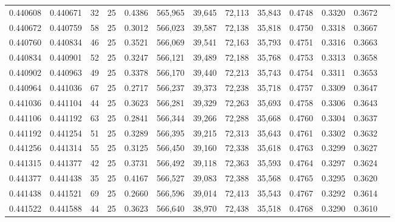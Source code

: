 \begin{tabular}{rrrrrrrrrrrrr}
0.440608 & 0.440671 &    32 &  25 &                                     0.4386 & 565,965 &  39,645 &  72,113 &  35,843 & 0.4748 & 0.3320 & 0.3672 \\
0.440672 & 0.440759 &    58 &  25 &                                     0.3012 & 566,023 &  39,587 &  72,138 &  35,818 & 0.4750 & 0.3318 & 0.3667 \\
0.440760 & 0.440834 &    46 &  25 &                                     0.3521 & 566,069 &  39,541 &  72,163 &  35,793 & 0.4751 & 0.3316 & 0.3663 \\
0.440834 & 0.440901 &    52 &  25 &                                     0.3247 & 566,121 &  39,489 &  72,188 &  35,768 & 0.4753 & 0.3313 & 0.3658 \\
0.440902 & 0.440963 &    49 &  25 &                                     0.3378 & 566,170 &  39,440 &  72,213 &  35,743 & 0.4754 & 0.3311 & 0.3653 \\
0.440964 & 0.441036 &    67 &  25 &                                     0.2717 & 566,237 &  39,373 &  72,238 &  35,718 & 0.4757 & 0.3309 & 0.3647 \\
0.441036 & 0.441104 &    44 &  25 &                                     0.3623 & 566,281 &  39,329 &  72,263 &  35,693 & 0.4758 & 0.3306 & 0.3643 \\
0.441106 & 0.441192 &    63 &  25 &                                     0.2841 & 566,344 &  39,266 &  72,288 &  35,668 & 0.4760 & 0.3304 & 0.3637 \\
0.441192 & 0.441254 &    51 &  25 &                                     0.3289 & 566,395 &  39,215 &  72,313 &  35,643 & 0.4761 & 0.3302 & 0.3632 \\
0.441256 & 0.441314 &    55 &  25 &                                     0.3125 & 566,450 &  39,160 &  72,338 &  35,618 & 0.4763 & 0.3299 & 0.3627 \\
0.441315 & 0.441377 &    42 &  25 &                                     0.3731 & 566,492 &  39,118 &  72,363 &  35,593 & 0.4764 & 0.3297 & 0.3624 \\
0.441377 & 0.441438 &    35 &  25 &                                     0.4167 & 566,527 &  39,083 &  72,388 &  35,568 & 0.4765 & 0.3295 & 0.3620 \\
0.441438 & 0.441521 &    69 &  25 &                                     0.2660 & 566,596 &  39,014 &  72,413 &  35,543 & 0.4767 & 0.3292 & 0.3614 \\
0.441522 & 0.441588 &    44 &  25 &                                     0.3623 & 566,640 &  38,970 &  72,438 &  35,518 & 0.4768 & 0.3290 & 0.3610 \\

\end{tabular}
